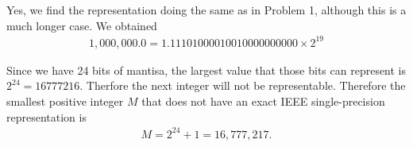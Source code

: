 \begin{questions}

\begin{solution}
Yes, we find the representation doing the same as in Problem 1, although this is a much longer case. We obtained 
\begin{align*}
1,000,000.0=1.11101000010010000000000\times 2^{19}
\end{align*}
\end{solution}
\begin{solution}
Since we have 24 bits of mantisa, the largest value that those bits can represent is $2^{24}=16777216$. Therfore the next integer will not be representable. Therefore the smallest positive integer $M$ that does not have an exact IEEE single-precision representation is
\begin{align*}
M=2^{24}+1=16,777,217.
\end{align*} 
\end{solution}
\end{questions}

